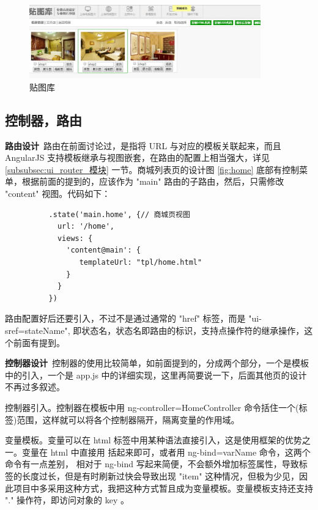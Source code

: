         \begin{figure}[H]
          \centering
          \includegraphics[width=10cm]{./img/tietuku.jpg}
          \caption{贴图库}
          \label{fig:tietuku}
        \end{figure}

    \subsection{控制器，路由}
      \label{subsec:控制器_路由}
        \textbf{路由设计}\, 路由在前面讨论过，是指将 URL 与对应的模板关联起来，而且 AngularJS 支持模板继承与视图嵌套，在路由的配置上相当强大，详见 \ref{subsubsec:ui_router_模块} 一节。商城列表页的设计图 \ref{fig:home} 底部有控制菜单，根据前面的提到的，应该作为 "main" 路由的子路由，然后，只需修改 "content" 视图。代码如下：
        \begin{lstlisting}
          .state('main.home', {// 商城页视图
            url: '/home',
            views: {
              'content@main': {
                 templateUrl: "tpl/home.html"
              }
            }
          })
        \end{lstlisting}
        路由配置好后还要引入，不过不是通过通常的 "href" 标签，而是 "ui-sref=stateName", 即状态名，状态名即路由的标识，支持点操作符的继承操作，这个前面有提到。
        \par
        \textbf{控制器设计}\, 控制器的使用比较简单，如前面提到的，分成两个部分，一个是模板中的引入，一个是 app.js 中的详细实现，这里再简要说一下，后面其他页的设计不再过多叙述。
        \par
        控制器引入。控制器在模板中用 ng-controller=HomeController 命令括住一个(标签)范围，这样就可以将各个控制器隔开，隔离变量的作用域。
        \par
        变量模板。变量可以在 html 标签中用某种语法直接引入，这是使用框架的优势之一。变量在 html 中直接用 {{}} 括起来即可，或者用 ng-bind=varName 命令，这两个命令有一点差别，{{}} 相对于 ng-bind 写起来简便，不会额外增加标签属性，导致标签的长度过长，但是有时刷新过快会导致出现 "{{item}}" 这种情况，但极为少见，因此项目中多采用这种方式，我把这种方式暂且成为变量模板。变量模板支持还支持 "." 操作符，即访问对象的 key 。
        \par
